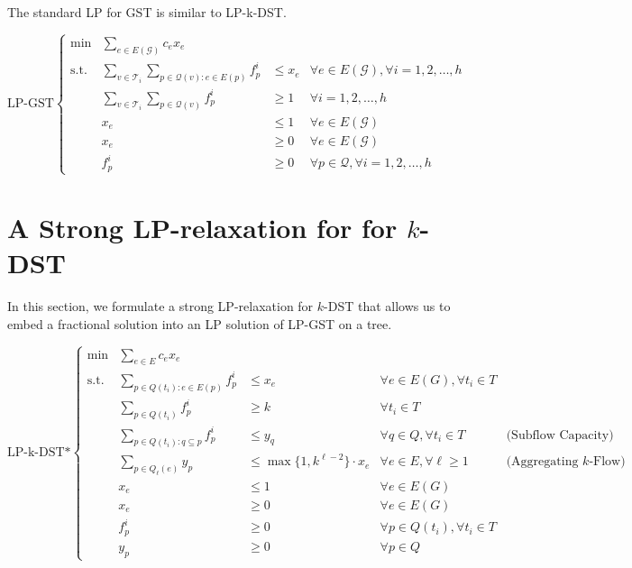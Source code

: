 \documentclass[11pt]{article}
\theoremstyle{definition}
\theoremstyle{remark}
\newcommand{\calG}{\mathcal{G}}
\newcommand{\calT}{\mathcal{T}}
\newcommand{\calQ}{\mathcal{Q}}
\begin{document}
The standard LP for GST is similar to LP-k-DST.

\[
\mbox{LP-GST}\left\{
\begin{array}{lrll}
  \min & \sum_{e\in E(\calG)}c_ex_e\\
  \mbox{s.t.}
    & \sum_{v\in \calT_i}\sum_{p\in \calQ(v):e\in E(p)}f^i_p &\leq x_e  
                                   & \forall e\in E(\calG), 
                                     \forall i=1,2,\ldots,h\\
    & \sum_{v\in \calT_i}\sum_{p\in \calQ(v)}f^i_p &\geq 1    
                                   & \forall i=1,2,\ldots,h\\
    & x_e                &\leq 1   & \forall e\in E(\calG)\\
    & x_e                &\geq 0   & \forall e\in E(\calG)\\
    & f^i_p              &\geq 0   & \forall p\in \calQ,
                                     \forall i=1,2,\ldots,h
\end{array}
\right. 
\]

\section{A Strong LP-relaxation for for $k$-DST}
\label{sec:strong-LP-k-DST}

In this section, we formulate a strong LP-relaxation for $k$-DST that
allows us to embed a fractional solution into an LP solution of LP-GST
on a tree. 

\[
\mbox{LP-k-DST*}\left\{
\begin{array}{lrllr}
  \min & \sum_{e\in E}c_ex_e\\
  \mbox{s.t.}
    & \sum_{p\in Q(t_i):e\in E(p)}f^i_p  &\leq x_e  & \forall e\in E(G), 
                                     \forall t_i\in T\\
    & \sum_{p\in Q(t_i)}f^i_p &\geq k & \forall t_i\in T\\
& \sum_{p\in Q(t_i):q\subseteq p}f^i_p  &\leq y_q  & \forall q\in Q, 
                                     \forall t_i\in T
                        &\mbox{(Subflow Capacity)}\\
    & \sum_{p\in Q_{\ell}(e)}y_p &\leq \max\{1,k^{\ell-2}\} \cdot x_e
                        & \forall e\in E, \forall \ell \geq 1
                        & \mbox{(Aggregating $k$-Flow)}\\
    & x_e                &\leq 1   & \forall e\in E(G)\\
    & x_e                &\geq 0   & \forall e\in E(G)\\
    & f^i_p              &\geq 0   & \forall p\in Q(t_i), 
                                     \forall t_i\in T\\
    & y_p                &\geq 0   & \forall p\in Q 
\end{array}
\right. 
\]
\end{document}
